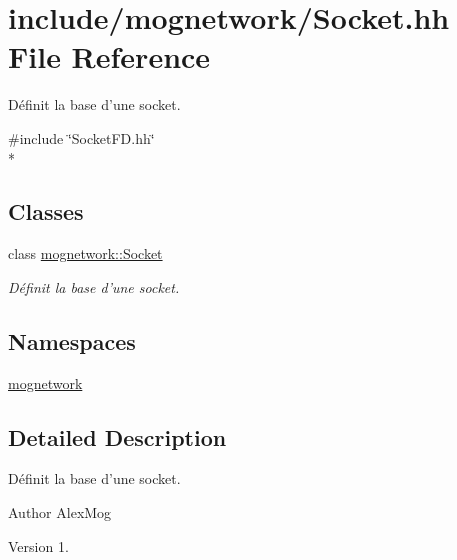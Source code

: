 \hypertarget{_socket_8hh}{\section{include/mognetwork/\-Socket.hh File Reference}
\label{_socket_8hh}
}


Définit la base d'une socket.  


{\ttfamily \#include \char`\"{}Socket\-F\-D.\-hh\char`\"{}}\\*
\subsection*{Classes}
\begin{DoxyCompactItemize}
\item 
class \hyperlink{classmognetwork_1_1_socket}{mognetwork\-::\-Socket}
\begin{DoxyCompactList}\small\item\em Définit la base d'une socket. \end{DoxyCompactList}\end{DoxyCompactItemize}
\subsection*{Namespaces}
\begin{DoxyCompactItemize}
\item 
\hyperlink{namespacemognetwork}{mognetwork}
\end{DoxyCompactItemize}


\subsection{Detailed Description}
Définit la base d'une socket. \begin{DoxyAuthor}{Author}
Alex\-Mog 
\end{DoxyAuthor}
\begin{DoxyVersion}{Version}
1. 
\end{DoxyVersion}
